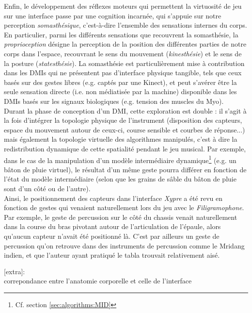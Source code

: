 \noindent Enfin, le développement des réflexes moteurs qui permettent la virtuosité de jeu sur une interface passe par une cognition incarnée, qui s'appuie sur notre perception \textit{somasthésique}, c'est-à-dire l'ensemble des sensations internes du corps. En particulier, parmi les différents sensations que recouvrent la somasthésie, la \textit{proprioception} désigne la perception de la position des différentes parties de notre corps dans l'espace, recouvrant le sens du mouvement (\textit{kinesthésie}) et le sens de la posture (\textit{statesthésie}). La somasthésie est particulièrement mise à contribution dans les \glspl{DMI} qui ne présentent pas d'interface physique tangible, tels que ceux basés sur des gestes libres (e.g. captés par une Kinect), et peut s'avérer être la seule sensation directe (i.e. non médiatisée par la machine) disponible dans les \glspl{DMI} basés sur les signaux biologiques (e.g. tension des muscles du Myo).\\
\indent Durant la phase de conception d'un \gls{DMI}, cette exploration est double : il s'agit à la fois d'intégrer la topologie physique de l'instrument (disposition des capteurs, espace du mouvement autour de ceux-ci, course sensible et courbes de réponse...) mais également la topologie virtuelle des algorithmes manipulés, c'est à dire la redistribution dynamique de cette spatialité pendant le jeu musical. Par exemple, dans le cas de la manipulation d'un modèle intermédiaire dynamique\footnote{Cf. section \ref{sec:algorithms:MID}} (e.g. un bâton de pluie virtuel), le résultat d'un même geste pourra différer en fonction de l'état du modèle intermédiaire (selon que les grains de sâble du bâton de pluie sont d'un côté ou de l'autre).\\
\indent Ainsi, le positionnement des capteurs dans l'interface \textit{Xypre} a été revu en fonction de gestes qui venaient naturellement lors du jeu avec le \textit{Filigramophone}. Par exemple, le geste de percussion sur le côté du chassis venait naturellement dans la course du bras pivotant autour de l'articulation de l'épaule, alors qu'aucun capteur n'avait été positionné là. C'est par ailleurs un geste de percussion qu'on retrouve dans des instruments de percussion comme le Mridang indien, et que l'auteur ayant pratiqué le tabla trouvait relativement aisé.

[extra]:\\
correpondance entre l'anatomie corporelle et celle de l'interface\\
 \cite{bin_hands_2017}


